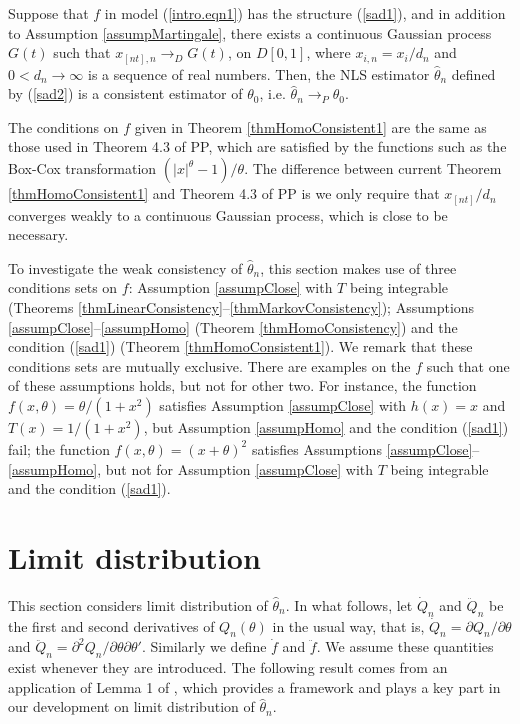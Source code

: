 \begin{thm}  Suppose that $f$ in model (\ref {intro.eqn1}) has the structure (\ref {sad1}), and in addition to Assumption \ref{assumpMartingale}, there exists a continuous Gaussian process $G(t)$ such that $x_{[nt], n} \to_D G(t)$, on $D[0,1]$, where $x_{i,n} = x_i / d_n$  and $0 < d_n \to \infty$ is a sequence of real numbers. Then,
 the NLS estimator $\hat{\theta}_n$ defined by (\ref {sad2}) is a consistent estimator of $\theta_0$, i.e. $\hat{\theta}_n \rightarrow_P \theta_0$.
\end{thm}





 The conditions on $f$ given in Theorem \ref {thmHomoConsistent1} are the same as those used in Theorem 4.3 of PP, which are satisfied by the functions such as  the Box-Cox transformation $(|x|^\theta - 1)/\theta$. The difference between current Theorem \ref{thmHomoConsistent1} and Theorem 4.3 of PP is   we only require that $x_{[nt]} / d_n$ converges weakly to a continuous Gaussian  process, which  is  close to be necessary.


To investigate the weak consistency of $\hat\theta_n$, this section makes use of three conditions sets on $f$: Assumption \ref{assumpClose} with $T$ being integrable (Theorems \ref{thmLinearConsistency}--\ref{thmMarkovConsistency}); Assumptions \ref{assumpClose}--\ref{assumpHomo} (Theorem \ref{thmHomoConsistency}) and the condition (\ref {sad1}) (Theorem \ref{thmHomoConsistent1}). We remark that these conditions sets are mutually exclusive. There are examples on the $f$ such that one of these assumptions holds, but not for other two. For instance, the function $f(x, \theta)=\theta/(1+x^2)$ satisfies Assumption \ref{assumpClose}  with $h(x)=x$ and $T(x)=1/(1+x^2)$, but Assumption \ref{assumpHomo} and  the condition (\ref {sad1}) fail; the function $f(x, \theta)=(x+\theta)^2$ satisfies Assumptions \ref{assumpClose}--\ref{assumpHomo}, but not for Assumption \ref{assumpClose} with $T$ being integrable and the condition (\ref {sad1}).


\section{Limit distribution} 
This section considers  limit distribution of $\hat{\theta}_n$. In what follows,  let $\dot{Q}_n$ and $\ddot{Q}_n$ be the first and second derivatives of $Q_n(\theta)$ in the usual way, that is, $\dot{Q}_n=\partial Q_n / \partial \theta$ and $\ddot{Q}_n=\partial^2 Q_n / \partial \theta \partial \theta'$. Similarly we define $\dot{f}$  and $\ddot{f}$. We assume these quantities exist whenever they are introduced. The following result  comes from an application of Lemma 1 of \cite{andrewssun2004}, which provides a framework and plays a key part in our development on limit distribution of $\hat{\theta}_n$.

